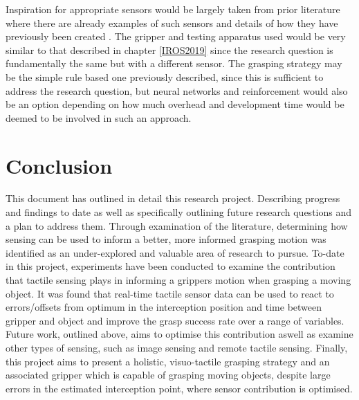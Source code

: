 Inspiration for appropriate sensors would be largely taken from prior literature where there are already examples of such sensors and details of how they have previously been created \cite{FingertipEmitterReceiverMovingObject, FingertipEmitterReceiverMovingObjectII}. The gripper and testing apparatus used would be very similar to that described in chapter \ref{IROS2019} since the research question is fundamentally the same but with a different sensor. The grasping strategy may be the simple rule based one previously described, since this is sufficient to address the research question, but neural networks and reinforcement would also be an option depending on how much overhead and development time would be deemed to be involved in such an approach. 

\section{Conclusion}
This document has outlined in detail this research project. Describing progress and findings to date as well as specifically outlining future research questions and a plan to address them. Through examination of the literature, determining how sensing can be used to inform a better, more informed grasping motion was identified as an under-explored and valuable area of research to pursue. To-date in this project, experiments have been conducted to examine the contribution that tactile sensing plays in informing a grippers motion when grasping a moving object. It was found that real-time tactile sensor data can be used to react to errors/offsets from optimum in the interception position and time between gripper and object and improve the grasp success rate over a range of variables. Future work, outlined above, aims to optimise this contribution aswell as examine other types of sensing, such as image sensing and remote tactile sensing. Finally, this project aims to present a holistic, visuo-tactile grasping strategy and an associated gripper which is capable of grasping moving objects, despite large errors in the estimated interception point, where sensor contribution is optimised.